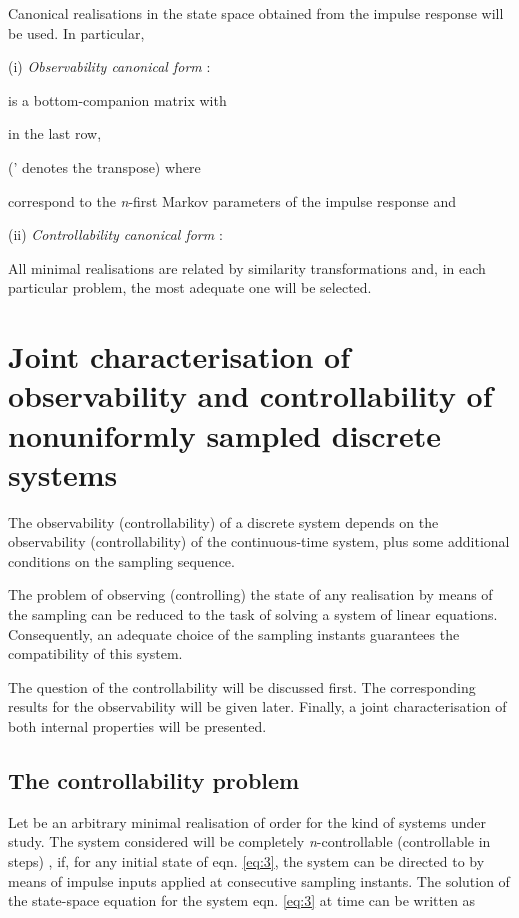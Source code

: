 \documentclass{article}
\begin{document}
Canonical realisations in the state space obtained from the
impulse response will be used. In particular,

(i) \textit{Observability canonical form} :

 is a  bottom-companion matrix with

in the last row,

(' denotes the transpose) where



correspond to the \textit{n}-first Markov parameters of the
impulse response  and


(ii) \textit{Controllability canonical form} :





All minimal realisations are related by similarity transformations
and, in each particular problem, the most adequate one will be
selected.

\section{Joint characterisation of observability and controllability
of nonuniformly sampled discrete systems}

The observability (controllability) of a discrete system depends
on the observability (controllability) of the continuous-time
system, plus some additional conditions on the sampling sequence.

The problem of observing (controlling) the state of any
realisation by means of the sampling can be reduced to the task of
solving a system of linear equations. Consequently, an adequate
choice of the sampling instants guarantees the compatibility of
this system.

The question of the controllability will be discussed first. The
corresponding results for the observability will be given later.
Finally, a joint characterisation of both internal properties will
be presented.

\subsection{The controllability problem} Let  be an
arbitrary minimal realisation of order  for the kind of systems
under study. The system considered will be completely
\textit{n}-controllable (controllable in  steps)
\cite{Ackermann}, \cite{Troch} if, for any initial state  of
eqn. \ref{eq:3}, the system can be directed to  by means of
 impulse inputs applied at  consecutive sampling instants.
The solution of the state-space equation for the system eqn.
\ref{eq:3} at time  can be written as
\end{document}
